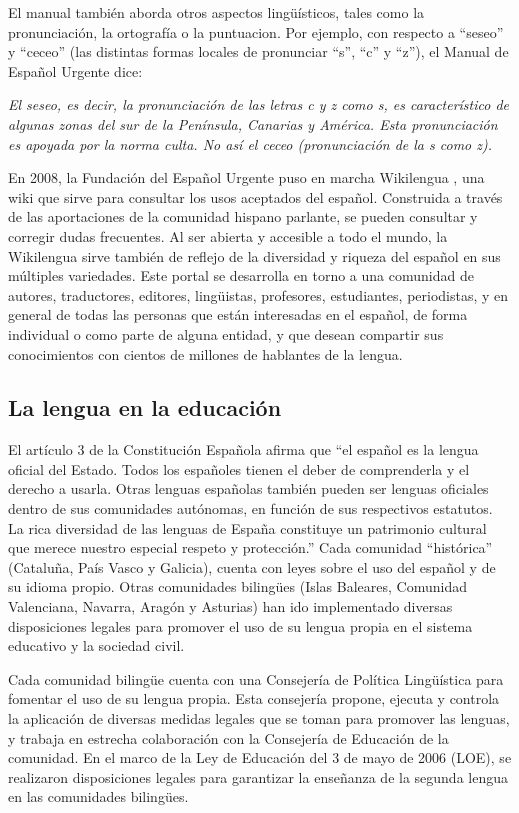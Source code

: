 \begin{multicols}{2}
El manual también aborda otros aspectos lingüísticos, tales como la pronunciación, la ortografía o la puntuacion. Por ejemplo, con respecto a ``seseo'' y ``ceceo'' (las distintas formas locales de pronunciar ``s'', ``c'' y ``z''), el Manual de Español Urgente dice:

\textit{El seseo, es decir, la pronunciación de las letras c y z como s, es característico de algunas zonas del sur de la Península, Canarias y América. Esta pronunciación es apoyada por la norma culta. No así el ceceo (pronunciación de la s como z).}

En 2008, la Fundación del Español Urgente puso en marcha Wikilengua \cite{wikilengua}, una wiki que sirve para consultar los usos aceptados del español. Construida a través de las aportaciones de la comunidad hispano parlante, se pueden consultar y corregir dudas frecuentes. Al ser abierta y accesible a todo el mundo, la Wikilengua sirve también de reflejo de la diversidad y riqueza del español en sus múltiples variedades. Este portal se  desarrolla en torno a una comunidad de autores, traductores, editores, lingüistas, profesores, estudiantes, periodistas, y en general de todas las personas que están interesadas en el español, de forma individual o como parte de alguna entidad, y que desean compartir sus conocimientos con cientos de millones de hablantes de la lengua.

\subsection{La lengua en la educación}

El artículo 3 de la Constitución Española afirma que ``el español es la lengua oficial del Estado. Todos los españoles tienen el deber de comprenderla y el derecho a usarla. Otras lenguas españolas también pueden ser  lenguas oficiales dentro de sus  comunidades autónomas, en función de sus respectivos estatutos. La rica diversidad de las lenguas de España constituye un patrimonio cultural que merece nuestro especial respeto y protección.'' Cada comunidad “histórica” (Cataluña, País Vasco y Galicia), cuenta con leyes sobre el uso del español y de su idioma propio. Otras comunidades bilingües (Islas Baleares, Comunidad Valenciana, Navarra, Aragón y Asturias) han ido implementado diversas disposiciones legales para promover el uso de su lengua propia en el sistema educativo y la sociedad civil.

Cada comunidad bilingüe cuenta con una Consejería de Política Lingüística para fomentar el uso de su lengua propia. Esta consejería propone, ejecuta y controla la aplicación de diversas medidas legales que se toman para promover las lenguas, y trabaja en estrecha colaboración con la Consejería de Educación de la comunidad. En el marco de la Ley de Educación del 3 de mayo de 2006 (LOE), se realizaron  disposiciones legales para garantizar la enseñanza de la segunda lengua en las comunidades bilingües.


\end{multicols}
